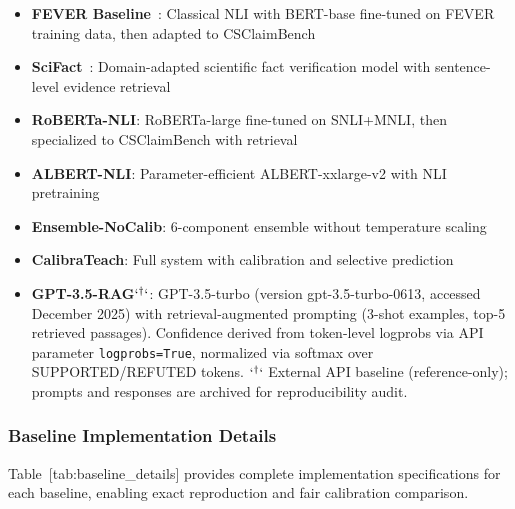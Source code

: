 \begin{itemize}
\item
  \textbf{FEVER Baseline}~: Classical NLI with BERT-base fine-tuned on FEVER training data, then adapted to CSClaimBench
\item
  \textbf{SciFact}~: Domain-adapted scientific fact verification model with sentence-level evidence retrieval
\item
  \textbf{RoBERTa-NLI}: RoBERTa-large fine-tuned on SNLI+MNLI, then specialized to CSClaimBench with retrieval
\item
  \textbf{ALBERT-NLI}: Parameter-efficient ALBERT-xxlarge-v2 with NLI pretraining
\item
  \textbf{Ensemble-NoCalib}: 6-component ensemble without temperature scaling
\item
  \textbf{CalibraTeach}: Full system with calibration and selective prediction
\item
  \textbf{GPT-3.5-RAG}\(`^{\dagger}`\): GPT-3.5-turbo (version gpt-3.5-turbo-0613, accessed December 2025) with retrieval-augmented prompting (3-shot examples, top-5 retrieved passages). Confidence derived from token-level logprobs via API parameter \texttt{logprobs=True}, normalized via softmax over SUPPORTED/REFUTED tokens. \(`^{\dagger}`\) External API baseline (reference-only); prompts and responses are archived for reproducibility audit.
\end{itemize}

\subsubsection{Baseline Implementation Details}\label{baseline-implementation-details}

Table~{[}tab:baseline\_details{]} provides complete implementation specifications for each baseline, enabling exact reproduction and fair calibration comparison.

